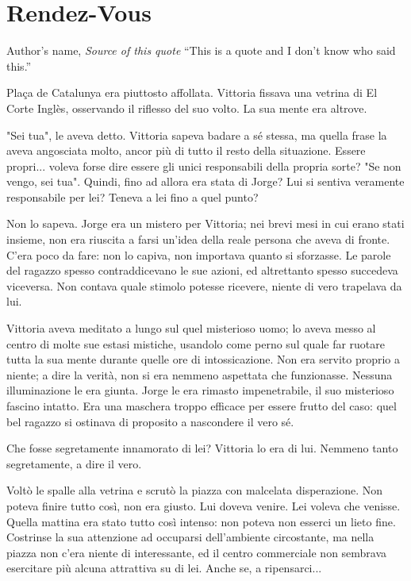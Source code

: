 \chapter{Rendez-Vous}

\begin{chapquote}{Author's name, \textit{Source of this quote}}
``This is a quote and I don't know who said this.''
\end{chapquote}


Plaça de Catalunya era piuttosto affollata. Vittoria fissava una vetrina di El Corte Inglès, osservando il riflesso del suo volto. La sua mente era altrove.

"Sei tua", le aveva detto. Vittoria sapeva badare a sé stessa, ma quella frase la aveva angosciata molto, ancor più di tutto il resto della situazione. Essere propri... voleva forse dire essere gli unici responsabili della propria sorte? "Se non vengo, sei tua". Quindi, fino ad allora era stata di Jorge? Lui si sentiva veramente responsabile per lei? Teneva a lei fino a quel punto?

Non lo sapeva. Jorge era un mistero per Vittoria; nei brevi mesi in cui erano stati insieme, non era riuscita a farsi un'idea della reale persona che aveva di fronte. C'era poco da fare: non lo capiva, non importava quanto si sforzasse. Le parole del ragazzo spesso contraddicevano le sue azioni, ed altrettanto spesso succedeva viceversa. Non contava quale stimolo potesse ricevere, niente di vero trapelava da lui.

Vittoria aveva meditato a lungo sul quel misterioso uomo; lo aveva messo al centro di molte sue estasi mistiche, usandolo come perno sul quale far ruotare tutta la sua mente durante quelle ore di intossicazione. Non era servito proprio a niente; a dire la verità, non si era nemmeno aspettata che funzionasse. Nessuna illuminazione le era giunta. Jorge le era rimasto impenetrabile, il suo misterioso fascino intatto. Era una maschera troppo efficace per essere frutto del caso: quel bel ragazzo si ostinava di proposito a nascondere il vero sé.

Che fosse segretamente innamorato di lei? Vittoria lo era di lui. Nemmeno tanto segretamente, a dire il vero.

Voltò le spalle alla vetrina e scrutò la piazza con malcelata disperazione. Non poteva finire tutto così, non era giusto. Lui doveva venire. Lei voleva che venisse. Quella mattina era stato tutto così intenso: non poteva non esserci un lieto fine. Costrinse la sua attenzione ad occuparsi dell'ambiente circostante, ma nella piazza non c'era niente di interessante, ed il centro commerciale non sembrava esercitare più alcuna attrattiva su di lei. Anche se, a ripensarci...

